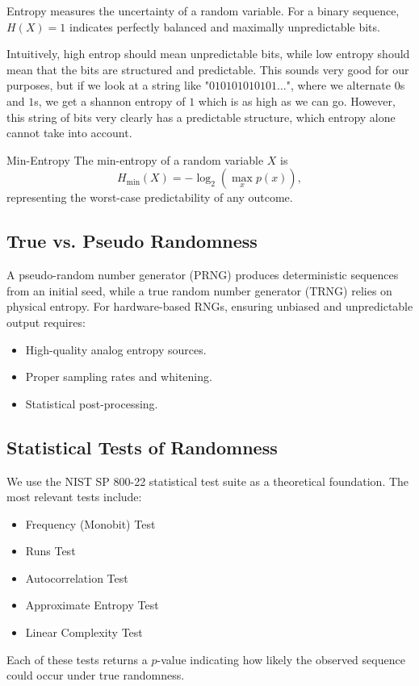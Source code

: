 Entropy measures the uncertainty of a random variable. 
For a binary sequence, $H(X) = 1$ indicates perfectly balanced and 
maximally unpredictable bits.

Intuitively, high entrop should mean unpredictable bits, while 
low entropy should mean that the bits are structured and predictable.
This sounds very good for our purposes, but if we look at 
a string like "$010101010101\dots$", where we alternate 
$0$s and $1$s, we get a shannon entropy of $1$ which is as high 
as we can go. However, this string of bits very clearly has 
a predictable structure, which entropy alone cannot take into account.

\begin{defn}{Min-Entropy}{}
The min-entropy of a random variable $X$ is
$$
H_{\text{min}}(X) = -\log_2 \left(\max_x p(x)\right),
$$
representing the worst-case predictability of any outcome.
\end{defn}

\subsection{True vs. Pseudo Randomness}
A pseudo-random number generator (PRNG) produces deterministic 
sequences 
from an initial seed, while a true random number generator (TRNG) 
relies 
on physical entropy. 
For hardware-based RNGs, ensuring unbiased and unpredictable output 
requires:
\begin{itemize}
    \item High-quality analog entropy sources.
    \item Proper sampling rates and whitening.
    \item Statistical post-processing.
\end{itemize}

\subsection{Statistical Tests of Randomness}
We use the NIST SP 800-22 statistical test suite as a theoretical 
foundation. The most relevant tests include:
\begin{itemize}
    \item Frequency (Monobit) Test
    \item Runs Test
    \item Autocorrelation Test
    \item Approximate Entropy Test
    \item Linear Complexity Test
\end{itemize}
Each of these tests returns a $p$-value indicating how likely the 
observed sequence could occur under true randomness.

